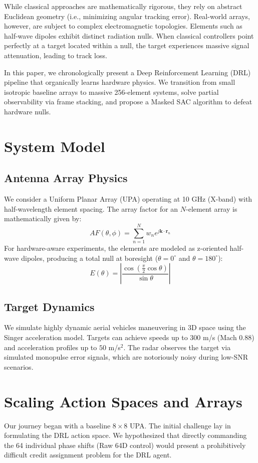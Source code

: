 \documentclass[journal, twocolumn]{IEEEtran}
\begin{document}
While classical approaches are mathematically rigorous, they rely on abstract Euclidean geometry (i.e., minimizing angular tracking error). Real-world arrays, however, are subject to complex electromagnetic topologies. Elements such as half-wave dipoles exhibit distinct radiation nulls. When classical controllers point perfectly at a target located within a null, the target experiences massive signal attenuation, leading to track loss.

In this paper, we chronologically present a Deep Reinforcement Learning (DRL) pipeline that organically learns hardware physics. We transition from small isotropic baseline arrays to massive 256-element systems, solve partial observability via frame stacking, and propose a Masked SAC algorithm to defeat hardware nulls.

\section{System Model}
\subsection{Antenna Array Physics}
We consider a Uniform Planar Array (UPA) operating at 10 GHz (X-band) with half-wavelength element spacing. The array factor for an $N$-element array is mathematically given by:
\begin{equation}
AF(\theta, \phi) = \sum_{n=1}^{N} w_n e^{j \mathbf{k} \cdot \mathbf{r}_n}
\end{equation}
For hardware-aware experiments, the elements are modeled as z-oriented half-wave dipoles, producing a total null at boresight ($\theta = 0^\circ$ and $\theta = 180^\circ$):
\begin{equation}
E(\theta) = \left| \frac{\cos\left(\frac{\pi}{2}\cos\theta\right)}{\sin\theta} \right|
\end{equation}

\subsection{Target Dynamics}
We simulate highly dynamic aerial vehicles maneuvering in 3D space using the Singer acceleration model. Targets can achieve speeds up to 300 m/s (Mach 0.88) and acceleration profiles up to $50$ m/s$^2$. The radar observes the target via simulated monopulse error signals, which are notoriously noisy during low-SNR scenarios.

\section{Scaling Action Spaces and Arrays}
Our journey began with a baseline $8 \times 8$ UPA. The initial challenge lay in formulating the DRL action space. We hypothesized that directly commanding the 64 individual phase shifts (Raw 64D control) would present a prohibitively difficult credit assignment problem for the DRL agent.
\end{document}
